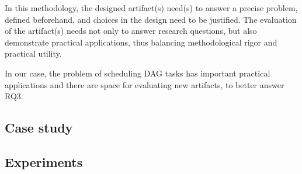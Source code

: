 In this methodology,
the designed artifact(s) need(s) to answer a precise problem,
defined beforehand, and choices in the design need to be justified.
The evaluation of the artifact(s) needs not only to answer research questions, but also
demonstrate practical applications,
thus balancing methodological rigor and practical utility.

In our case, the problem of scheduling DAG tasks
has important practical applications and there are space 
for evaluating new artifacts, to better answer RQ3.

\subsection{Case study}

\subsection{Experiments}
 
 


